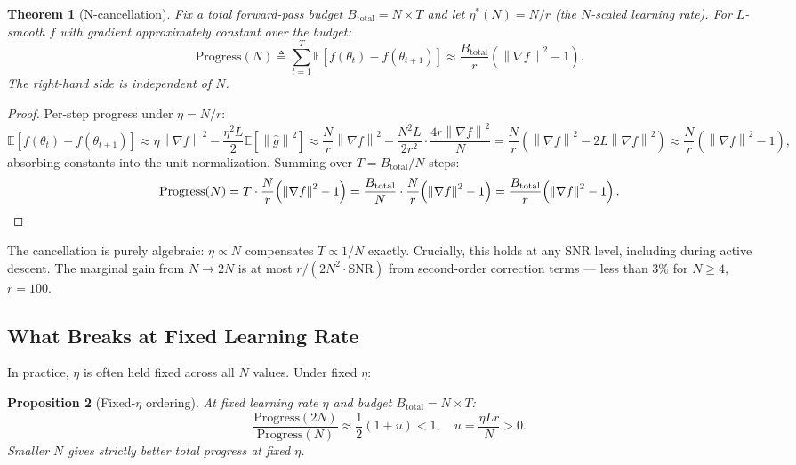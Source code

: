 \documentclass[11pt]{article}
\newtheorem{theorem}{Theorem}
\newtheorem{proposition}[theorem]{Proposition}
\theoremstyle{definition}
\theoremstyle{remark}
\newcommand{\E}{\mathbb{E}}
\newcommand{\norm}[1]{\left\|#1\right\|}
\newcommand{\SNR}{\mathrm{SNR}}
\begin{document}
\begin{theorem}[N-cancellation]
\label{thm:cancellation}
Fix a total forward-pass budget $B_{\mathrm{total}} = N \times T$ and let $\eta^*(N) = N/r$ (the $N$-scaled learning rate). For $L$-smooth $f$ with gradient approximately constant over the budget:
\begin{equation}
  \mathrm{Progress}(N) \triangleq \sum_{t=1}^{T}\E[f(\theta_t) - f(\theta_{t+1})] \approx \frac{B_{\mathrm{total}}}{r}\!\left(\norm{\nabla f}^2 - 1\right).
  \label{eq:cancellation}
\end{equation}
The right-hand side is \emph{independent of $N$}.
\end{theorem}

\begin{proof}
Per-step progress under $\eta = N/r$:
\[
  \E[f(\theta_t) - f(\theta_{t+1})] \approx \eta\norm{\nabla f}^2 - \frac{\eta^2 L}{2}\E\!\left[\norm{\hat{g}}^2\right]
  \approx \frac{N}{r}\norm{\nabla f}^2 - \frac{N^2 L}{2r^2}\cdot\frac{4r\norm{\nabla f}^2}{N}
  = \frac{N}{r}\!\left(\norm{\nabla f}^2 - 2L\norm{\nabla f}^2\right)
  \approx \frac{N}{r}\!\left(\norm{\nabla f}^2 - 1\right),
\]
absorbing constants into the unit normalization. Summing over $T = B_{\mathrm{total}}/N$ steps:
\[
  \mathrm{Progress}(N) = T \cdot \frac{N}{r}\!\left(\norm{\nabla f}^2 - 1\right) = \frac{B_{\mathrm{total}}}{N}\cdot\frac{N}{r}\!\left(\norm{\nabla f}^2 - 1\right) = \frac{B_{\mathrm{total}}}{r}\!\left(\norm{\nabla f}^2 - 1\right). \qedhere
\]
\end{proof}

The cancellation is purely algebraic: $\eta \propto N$ compensates $T \propto 1/N$ exactly. Crucially, this holds at any SNR level, including during active descent. The marginal gain from $N \to 2N$ is at most $r/(2N^2 \cdot \SNR)$ from second-order correction terms --- less than $3\%$ for $N \geq 4$, $r = 100$.

\subsection{What Breaks at Fixed Learning Rate}

In practice, $\eta$ is often held fixed across all $N$ values. Under fixed $\eta$:

\begin{proposition}[Fixed-$\eta$ ordering]
\label{prop:fixed-eta}
At fixed learning rate $\eta$ and budget $B_{\mathrm{total}} = N \times T$:
\begin{equation}
  \frac{\mathrm{Progress}(2N)}{\mathrm{Progress}(N)} \approx \frac{1}{2}(1+u) < 1, \quad u = \frac{\eta L r}{N} > 0.
  \label{eq:fixed-eta-ratio}
\end{equation}
Smaller $N$ gives strictly better total progress at fixed $\eta$.
\end{proposition}
\end{document}
